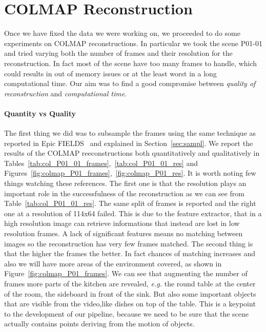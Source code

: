 

\section{COLMAP Reconstruction}
Once we have fixed the data we were working on, we proceeded to do some experiments
on COLMAP reconstructions. In particular we took the scene P01-01 and tried varying 
both the number of frames and their resolution for the reconstruction. In fact most
of the scene have too many frames to handle, which could results in out of memory issues
or at the least worst in a long computational time. Our aim was to find a good compromise
between \textit{quality of reconstruction} and \textit{computational time}.

\paragraph{Quantity vs Quality }The first thing we did was to subsample the frames using the same technique 
as reported in Epic FIELDS~\cite{epic_fields} and explained in Section~\ref{sec:sampl}.
We report the results of the COLMAP reeconstructions both quantitatively and qualitatively
in Tables~\ref{tab:col_P01_01_frames},~\ref{tab:col_P01_01_res} and Figures~\ref{fig:colmap_P01_frames},~\ref{fig:colmap_P01_res}. It is worth noting
few things watching these references. The first one is that the 
resolution plays an important role in the successfulness of the reconstruction as 
we can see from Table~\ref{tab:col_P01_01_res}. The same split
of frames is reported and the right one at a resolution of 114x64 failed. This 
is due to the feature extractor, that in a high resolution image can retrieve 
informations that instead are lost in low resolution frames. A lack of significant features 
means no matching between images so the reconstruction has very few frames matched.
The second thing is that the higher the frames the better. In fact chances of matching
increases and also we will have more areas of the environment covered, as shown in Figure~\ref{fig:colmap_P01_frames}.
We can see that augmenting the number of frames more parts of the kitchen are revealed,
\textit{e.g.} the round table at the center of the room, the sideboard in front of the sink.
But also some important objects that are visible from the video,like dishes on top 
of the table. This is a keypoint to the development of our pipeline, because we need to 
be sure that the scene actually contains points deriving from the motion of objects.

